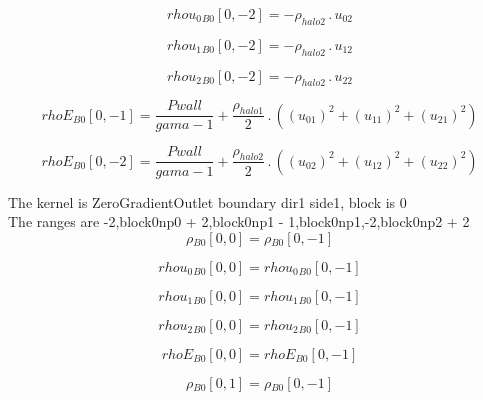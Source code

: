 \documentclass{article}
\begin{document}
\begin{dmath}{rhou_{0}{_{B0}}}[{0,-2}] = - \rho_{halo 2} \,.\, u_{02}\end{dmath}

\begin{dmath}{rhou_{1}{_{B0}}}[{0,-2}] = - \rho_{halo 2} \,.\, u_{12}\end{dmath}

\begin{dmath}{rhou_{2}{_{B0}}}[{0,-2}] = - \rho_{halo 2} \,.\, u_{22}\end{dmath}

\begin{dmath}{rhoE{_{B0}}}[{0,-1}] = \frac{Pwall}{gama - 1} + \frac{\rho_{halo 1}}{2} \,.\, \left(\left(u_{01} \right)^{2} + \left(u_{11} \right)^{2} + \left(u_{21} \right)^{2}\right)\end{dmath}

\begin{dmath}{rhoE{_{B0}}}[{0,-2}] = \frac{Pwall}{gama - 1} + \frac{\rho_{halo 2}}{2} \,.\, \left(\left(u_{02} \right)^{2} + \left(u_{12} \right)^{2} + \left(u_{22} \right)^{2}\right)\end{dmath}

\noindent The kernel is ZeroGradientOutlet boundary dir1 side1, block is 0\\\noindent The ranges are -2,block0np0 + 2,block0np1 - 1,block0np1,-2,block0np2 + 2\\\begin{dmath}{\rho{_{B0}}}[{0,0}] = {\rho{_{B0}}}[{0,-1}]\end{dmath}

\begin{dmath}{rhou_{0}{_{B0}}}[{0,0}] = {rhou_{0}{_{B0}}}[{0,-1}]\end{dmath}

\begin{dmath}{rhou_{1}{_{B0}}}[{0,0}] = {rhou_{1}{_{B0}}}[{0,-1}]\end{dmath}

\begin{dmath}{rhou_{2}{_{B0}}}[{0,0}] = {rhou_{2}{_{B0}}}[{0,-1}]\end{dmath}

\begin{dmath}{rhoE{_{B0}}}[{0,0}] = {rhoE{_{B0}}}[{0,-1}]\end{dmath}

\begin{dmath}{\rho{_{B0}}}[{0,1}] = {\rho{_{B0}}}[{0,-1}]\end{dmath}
\end{document}
